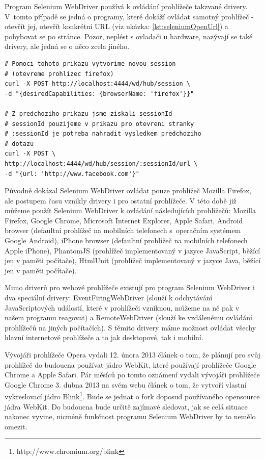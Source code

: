 \documentclass[thesis=M,czech]{FITthesis}[2013/05/10]
\begin{document}
Program Selenium WebDriver používá k ovládání prohlížeče takzvané drivery. V~tomto případě se jedná o programy, které dokáží ovládat samotný prohlížeč - otevřít jej, otevřít konkrétní URL (viz ukázka: \ref{lst:seleniumOpenUrl}) a pohybovat se po stránce. Pozor, neplést s ovladači u hardware, nazývají se také drivery, ale jedná se o něco zcela jiného. 

\begin{lstlisting}[caption={Příklad otevření URL v programu Selenium WebDriver pomocí cURL},label=lst:seleniumOpenUrl,belowcaptionskip=0.4cm]
# Pomoci tohoto prikazu vytvorime novou session 
# (otevreme prohlizec firefox)
curl -X POST http://localhost:4444/wd/hub/session \
-d "{desiredCapabilities: {browserName: 'firefox'}}"

# Z predchoziho prikazu jsme ziskali sessionId
# sessionId pouzijeme v prikazu pro otevreni stranky
# :sessionId je potreba nahradit vysledkem predchoziho
# dotazu
curl -X POST \
http://localhost:4444/wd/hub/session/:sessionId/url \
-d "{url: 'http://www.facebook.com'}" 
\end{lstlisting}

Původně dokázal Selenium WebDriver ovládat pouze prohlížeč Mozilla Firefox, ale postupem času vznikly drivery i pro ostatní prohlížeče. V této době již můžeme použít Selenium WebDriver k ovládání následujících prohlížečů: Mozilla Firefox, Google Chrome, Microsoft Internet Explorer, Apple Safari, Android browser (defaultní prohlížeč na mobilních telefonech s~operačním systémem Google Android), iPhone browser (defaultní prohlížeč na mobilních telefonech Apple iPhone), PhantomJS (prohlížeč implementovaný v jazyce JavaScript, běžící jen v paměti počítače), HtmlUnit (prohlížeč implementovaný v jazyce Java, běžící jen v paměti počítače). 

Mimo driverů pro webové prohlížeče existují pro program Selenium WebDriver i dva speciální drivery: EventFiringWebDriver (slouží k odchytávání JavaScriptových událostí, které v prohlížeči vzniknou, můžeme na ně pak v našem programu reagovat) a RemoteWebDriver (slouží ke vzdálenému ovládání prohlížečů na jiných počítačích). S těmito drivery máme možnost ovládat všechy hlavní internetové prohlížeče a to jak desktopové, tak i mobilní.

Vývojáři prohlížeče Opera vydali 12. února 2013 
článek \cite{web:operaMovesToWebkit} o tom, že plánují pro svůj prohlížeč do budoucna používat jádro WebKit, které používají prohlížeče Google Chrome a Apple Safari. Pár měsíců po tomto oznámení vydali vývojáři prohlížeče Google Chrome 3. dubna 2013 na svém webu článek \cite{web:chromiumBlink} o tom, že vytvoří vlastní vykreslovací jádro Blink\footnote{http://www.chromium.org/blink}. Bude se jednat o fork doposud používaného opensource jádra WebKit. Do budoucna bude určitě zajímavé sledovat, jak se celá situace nakonec vyvine, nicméně funkčnost programu Selenium WebDriver by to nemělo omezit.
\end{document}
